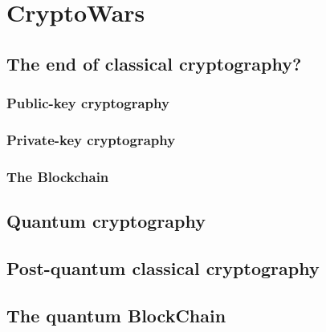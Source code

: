 %
%

\section{CryptoWars\texttrademark}



\subsection{The end of classical cryptography?}

\subsubsection{Public-key cryptography}

\subsubsection{Private-key cryptography}

\subsubsection{The Blockchain}

\subsection{Quantum cryptography}

\subsection{Post-quantum classical cryptography}

\subsection{The quantum BlockChain}
